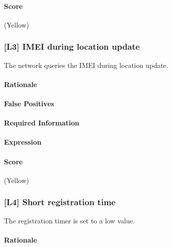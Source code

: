 \documentclass[a4paper,11pt,notitlepage,bigheadings,oneside]{scrartcl}
\begin{document}
\TBD{}

\paragraph{Score}

\TBD{} (Yellow)

\subsubsection{[L3] IMEI during location update}

The network queries the IMEI during location update.

\paragraph{Rationale}

\TBD{}

\paragraph{False Positives}

\TBD{}

\paragraph{Required Information}

\TBD{}

\paragraph{Expression}

\TBD{}

\paragraph{Score}

\TBD{} (Yellow)

\subsubsection{[L4] Short registration time}

The registration timer is set to a low value.

\paragraph{Rationale}
\end{document}

